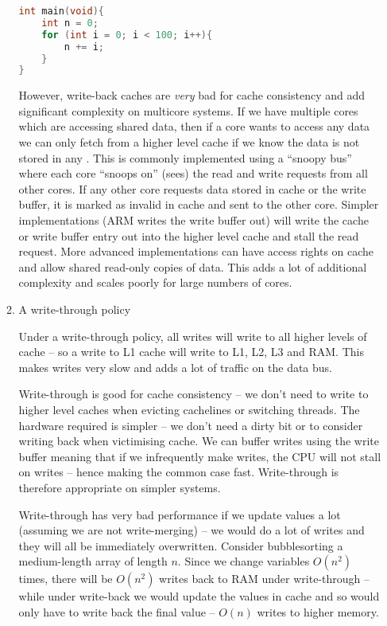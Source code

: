 \documentclass[10pt,\jkfside,a4paper]{article}
\begin{document}
\begin{enumerate}
\begin{enumerate}[label=(\alph*)]
\begin{lstlisting}[language=C]
int main(void){
	int n = 0;
	for (int i = 0; i < 100; i++){
		n += i;
	}
}
\end{lstlisting}

However, write-back caches are \textit{very} bad for cache consistency and
add significant complexity on multicore systems. If we have multiple cores
which are accessing shared data, then if a core wants to access any data we
can only fetch from a higher level cache if we know the data is not stored
in any . This is commonly implemented using a
``snoopy bus'' where each core ``snoops on'' (sees) the read and write
requests from all other cores. If any other core requests data stored in
cache or the write buffer, it is marked as invalid in cache and sent to the
other core. Simpler implementations (ARM writes the write buffer out) will
write the cache or write buffer entry out into the higher level cache and
stall the read request. More advanced implementations can have access rights
on cache and allow shared read-only copies of data. This adds a lot of
additional complexity and scales poorly for large numbers of cores.

\item A write-through policy

Under a write-through policy, all writes will write to all higher levels of
cache -- so a write to L1 cache will write to L1, L2, L3 and RAM. This makes
writes very slow and adds a lot of traffic on the data bus.

Write-through is good for cache consistency -- we don't need to write to
higher level caches when evicting cachelines or switching threads. The hardware
required is simpler -- we don't need a dirty bit or to consider writing back
when victimising cache. We can buffer writes using the write buffer meaning
that if we infrequently make writes, the CPU will not stall on writes --
hence making the common case fast. Write-through is therefore appropriate on
simpler systems.

Write-through has very bad performance if we update values a lot (assuming we
are not write-merging) -- we would do a lot of writes and they will all be
immediately overwritten. Consider bubblesorting a medium-length array of
length $n$. Since we change variables $O(n^2)$ times, there will be
$O(n^2)$ writes back to RAM under write-through -- while under write-back we
would update the values in cache and so would only have to write back the
final value -- $O(n)$ writes to higher memory.


\end{enumerate}
\end{enumerate}
\end{document}
